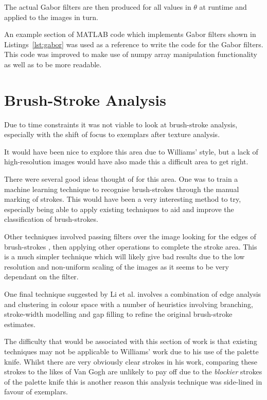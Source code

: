 The actual Gabor filters are then produced for all values in $\theta$ at runtime and applied to
the images in turn.

An example section of MATLAB code which implements Gabor filters shown in Listings~\ref{lst:gabor}
\cite{Yang2010Gabor} was used as a reference to write the code for the Gabor filters. This code
was improved to make use of numpy array manipulation functionality as well as to be more readable.


\section{Brush-Stroke Analysis}

Due to time constraints it was not viable to look at brush-stroke analysis, especially with the
shift of focus to exemplars after texture analysis.

It would have been nice to explore this area due to Williams' style, but a lack of high-resolution
images would have also made this a difficult area to get right.

There were several good ideas thought of for this area. One was to train a machine learning 
technique to recognise brush-strokes through the manual marking of strokes. This would have been a
very interesting method to try, especially being able to apply existing techniques to aid and
improve the classification of brush-strokes.

Other techniques involved passing filters over the image looking for the edges of brush-strokes
\cite{Berezhnoy2009Automatic}, then applying other operations to complete the stroke area. This
is a much simpler technique which will likely give bad results due to the low resolution and
non-uniform scaling of the images as it seems to be very dependant on the filter.

One final technique suggested by Li et al.\cite{Li2012Rhythmic} involves a combination of edge
analysis and clustering in colour space with a number of heuristics involving branching, 
stroke-width modelling and gap filling to refine the original brush-stroke estimates.

The difficulty that would be associated with this section of work is that existing techniques may
not be applicable to Williams' work due to his use of the palette knife. Whilst there are very
obviously clear strokes in his work, comparing these strokes to the likes of Van Gogh are unlikely
to pay off due to the \emph{blockier} strokes of the palette knife this is another reason this analysis
technique was side-lined in favour of exemplars.


